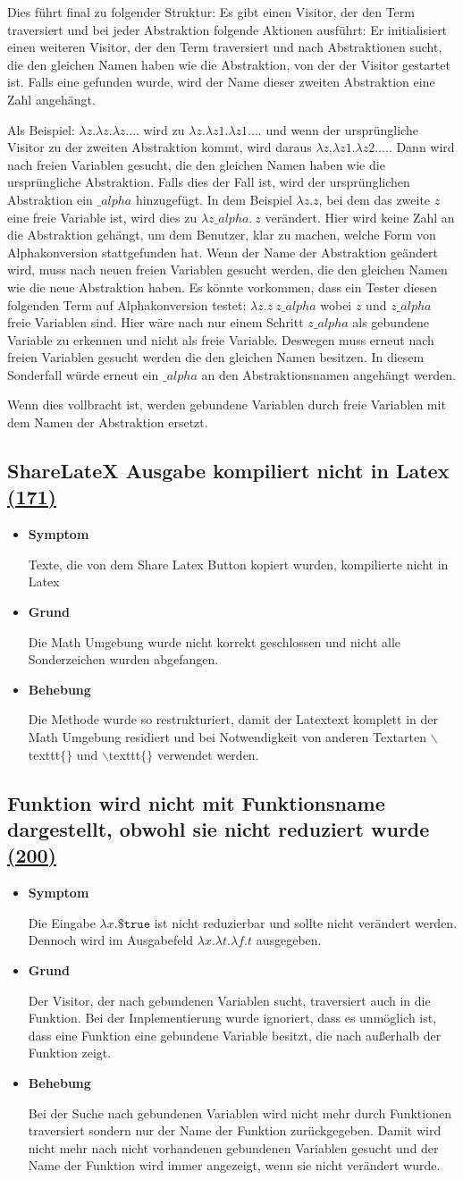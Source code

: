 \documentclass[parskip=full,11pt,twoside]{scrartcl}
\newcommand{\issueref}[1]{
    \href{https://git.scc.kit.edu/ap/Aurora/issues/#1}{(#1)}
}
\newcommand{\regrtest}[5]{
    \subsection{#1 \issueref{#2}}
    \begin{itemize}
        \item \textbf{Symptom}
            #3
        \item \textbf{Grund}
            #4
        \item \textbf{Behebung}
            #5
    \end{itemize}
}
\begin{document}
{Dies führt final zu folgender Struktur:
Es gibt einen Visitor, der den Term traversiert und bei jeder Abstraktion folgende Aktionen ausführt:
Er initialisiert einen weiteren Visitor, der den Term traversiert und nach Abstraktionen sucht, die den gleichen Namen haben wie die Abstraktion,
von der der Visitor gestartet ist.
Falls eine gefunden wurde, wird der Name dieser zweiten Abstraktion eine Zahl angehängt.

Als Beispiel: $\lambda z. \lambda z. \lambda z. ...$ wird zu $\lambda z. \lambda z1. \lambda z1. ...$
und wenn der ursprüngliche Visitor zu der zweiten Abstraktion kommt, wird daraus $\lambda z. \lambda z1. \lambda z2. ...$.
Dann wird nach freien Variablen gesucht, die den gleichen Namen haben wie die ursprüngliche Abstraktion.
Falls dies der Fall ist, wird der ursprünglichen Abstraktion ein $\_ alpha$ hinzugefügt.
In dem Beispiel $\lambda z. z$, bei dem das zweite $z$ eine freie Variable ist, wird dies zu $\lambda z \_ alpha. \  z$ verändert.
Hier wird keine Zahl an die Abstraktion gehängt, um dem Benutzer, klar zu machen, welche Form von Alphakonversion stattgefunden hat.
Wenn der Name der Abstraktion geändert wird, muss  nach neuen freien Variablen gesucht werden, die den gleichen Namen wie die neue Abstraktion haben.
Es könnte vorkommen, dass ein Tester diesen folgenden Term auf Alphakonversion testet:
$\lambda z. z \ z\_ alpha$ wobei $z$ und $z\_ alpha$ freie Variablen sind.
Hier wäre nach nur einem Schritt $z\_ alpha$ als gebundene Variable zu erkennen und nicht als freie Variable.
Deswegen muss erneut nach freien Variablen gesucht werden die den gleichen Namen besitzen.
In diesem Sonderfall würde erneut ein $\_ alpha$ an den Abstraktionsnamen angehängt werden.

Wenn dies vollbracht ist, werden gebundene Variablen durch freie Variablen mit dem Namen der Abstraktion ersetzt.
}

\regrtest{ShareLateX Ausgabe kompiliert nicht in Latex}{171}
{
	Texte, die von dem Share Latex Button kopiert wurden, kompilierte nicht in Latex
}{
Die Math Umgebung wurde nicht korrekt geschlossen und nicht alle Sonderzeichen wurden abgefangen.
}{
Die Methode wurde so restrukturiert, damit der Latextext komplett in der Math Umgebung residiert und
bei Notwendigkeit von anderen Textarten $\backslash$texttt$\{ \}$  und $\backslash$texttt$\{ \}$
verwendet werden.
}

\regrtest{Funktion wird nicht mit Funktionsname dargestellt, obwohl sie nicht reduziert wurde}{200}
{
	Die Eingabe $\lambda x. \$ \texttt{true}$ ist nicht reduzierbar und sollte nicht verändert werden.
	Dennoch wird im Ausgabefeld $\lambda x. \lambda t. \lambda f. t$ ausgegeben.
}{
Der Visitor, der nach gebundenen Variablen sucht, traversiert auch in die Funktion.
Bei der Implementierung wurde ignoriert, dass es unmöglich ist, dass eine Funktion eine gebundene Variable besitzt,
die nach außerhalb der Funktion zeigt.
}{
Bei der Suche nach gebundenen Variablen wird nicht mehr durch Funktionen traversiert sondern nur der Name
der Funktion zurückgegeben.
Damit wird nicht mehr nach nicht vorhandenen gebundenen Variablen gesucht und der Name der Funktion wird 
immer angezeigt, wenn sie nicht verändert wurde.
}
\end{document}
